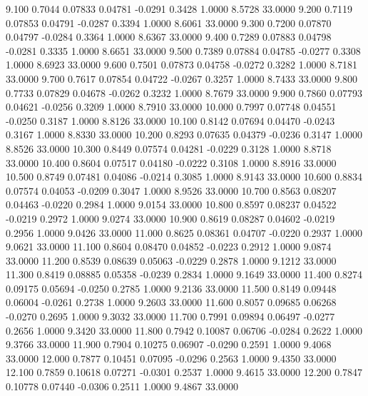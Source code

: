    9.100   0.7044   0.07833   0.04781  -0.0291   0.3428   1.0000   8.5728  33.0000
   9.200   0.7119   0.07853   0.04791  -0.0287   0.3394   1.0000   8.6061  33.0000
   9.300   0.7200   0.07870   0.04797  -0.0284   0.3364   1.0000   8.6367  33.0000
   9.400   0.7289   0.07883   0.04798  -0.0281   0.3335   1.0000   8.6651  33.0000
   9.500   0.7389   0.07884   0.04785  -0.0277   0.3308   1.0000   8.6923  33.0000
   9.600   0.7501   0.07873   0.04758  -0.0272   0.3282   1.0000   8.7181  33.0000
   9.700   0.7617   0.07854   0.04722  -0.0267   0.3257   1.0000   8.7433  33.0000
   9.800   0.7733   0.07829   0.04678  -0.0262   0.3232   1.0000   8.7679  33.0000
   9.900   0.7860   0.07793   0.04621  -0.0256   0.3209   1.0000   8.7910  33.0000
  10.000   0.7997   0.07748   0.04551  -0.0250   0.3187   1.0000   8.8126  33.0000
  10.100   0.8142   0.07694   0.04470  -0.0243   0.3167   1.0000   8.8330  33.0000
  10.200   0.8293   0.07635   0.04379  -0.0236   0.3147   1.0000   8.8526  33.0000
  10.300   0.8449   0.07574   0.04281  -0.0229   0.3128   1.0000   8.8718  33.0000
  10.400   0.8604   0.07517   0.04180  -0.0222   0.3108   1.0000   8.8916  33.0000
  10.500   0.8749   0.07481   0.04086  -0.0214   0.3085   1.0000   8.9143  33.0000
  10.600   0.8834   0.07574   0.04053  -0.0209   0.3047   1.0000   8.9526  33.0000
  10.700   0.8563   0.08207   0.04463  -0.0220   0.2984   1.0000   9.0154  33.0000
  10.800   0.8597   0.08237   0.04522  -0.0219   0.2972   1.0000   9.0274  33.0000
  10.900   0.8619   0.08287   0.04602  -0.0219   0.2956   1.0000   9.0426  33.0000
  11.000   0.8625   0.08361   0.04707  -0.0220   0.2937   1.0000   9.0621  33.0000
  11.100   0.8604   0.08470   0.04852  -0.0223   0.2912   1.0000   9.0874  33.0000
  11.200   0.8539   0.08639   0.05063  -0.0229   0.2878   1.0000   9.1212  33.0000
  11.300   0.8419   0.08885   0.05358  -0.0239   0.2834   1.0000   9.1649  33.0000
  11.400   0.8274   0.09175   0.05694  -0.0250   0.2785   1.0000   9.2136  33.0000
  11.500   0.8149   0.09448   0.06004  -0.0261   0.2738   1.0000   9.2603  33.0000
  11.600   0.8057   0.09685   0.06268  -0.0270   0.2695   1.0000   9.3032  33.0000
  11.700   0.7991   0.09894   0.06497  -0.0277   0.2656   1.0000   9.3420  33.0000
  11.800   0.7942   0.10087   0.06706  -0.0284   0.2622   1.0000   9.3766  33.0000
  11.900   0.7904   0.10275   0.06907  -0.0290   0.2591   1.0000   9.4068  33.0000
  12.000   0.7877   0.10451   0.07095  -0.0296   0.2563   1.0000   9.4350  33.0000
  12.100   0.7859   0.10618   0.07271  -0.0301   0.2537   1.0000   9.4615  33.0000
  12.200   0.7847   0.10778   0.07440  -0.0306   0.2511   1.0000   9.4867  33.0000
